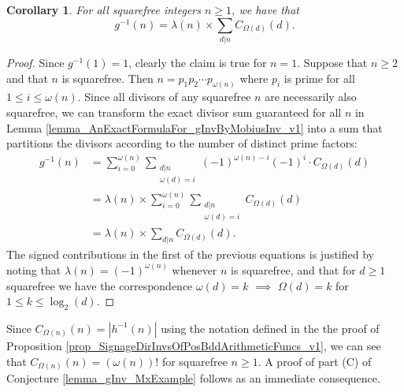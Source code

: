 \documentclass[11pt,reqno,a4letter]{article}
\numberwithin{figure}{section}
\numberwithin{table}{section}
\theoremstyle{plain}
\newtheorem{cor}[theorem]{Corollary}
\numberwithin{theorem}{section}
\theoremstyle{definition}
\begin{document}
\begin{cor} 
\label{cor_AnExactFormulaFor_gInvByMobiusInv_nSqFree_v2} 
For all squarefree integers $n \geq 1$, we have that 
\begin{equation} 
\label{eqn_gInvnSqFreeN_exactDivSum_Formula} 
g^{-1}(n) = \lambda(n) \times \sum_{d|n} C_{\Omega(d)}(d). 
\end{equation} 
\end{cor} 
\begin{proof} 
Since $g^{-1}(1) = 1$, clearly the claim is true for $n = 1$. Suppose that $n \geq 2$ and that 
$n$ is squarefree. Then $n = p_1p_2 \cdots p_{\omega(n)}$ where $p_i$ is prime for all 
$1 \leq i \leq \omega(n)$. Since all divisors of any squarefree $n$ are necessarily also squarefree, 
we can transform the exact divisor sum guaranteed for all $n$ in 
Lemma \ref{lemma_AnExactFormulaFor_gInvByMobiusInv_v1} into a sum that partitions the divisors 
according to the number of distinct prime factors: 
\begin{align*} 
g^{-1}(n) & = \sum_{i=0}^{\omega(n)} \sum_{\substack{d|n \\ \omega(d)=i}} (-1)^{\omega(n) - i} (-1)^{i} \cdot 
     C_{\Omega(d)}(d) \\ 
     & = \lambda(n) \times \sum_{i=0}^{\omega(n)} \sum_{\substack{d|n \\ \omega(d)=i}} C_{\Omega(d)}(d) \\ 
     & = \lambda(n) \times \sum_{d|n} C_{\Omega(d)}(d). 
\end{align*} 
The signed contributions in the first of the previous equations is 
justified by noting that $\lambda(n) = (-1)^{\omega(n)}$ 
whenever $n$ is squarefree, and that for $d \geq 1$
 squarefree we have the correspondence 
 $\omega(d) = k$ $\implies$ $\Omega(d) = k$ for $1 \leq k \leq \log_2(d)$. 
\end{proof} 

Since $C_{\Omega(n)}(n) = |h^{-1}(n)|$ using the notation defined in the the proof of 
Proposition \ref{prop_SignageDirInvsOfPosBddArithmeticFuncs_v1}, we can see that 
$C_{\Omega(n)}(n) = (\omega(n))!$ for squarefree $n \geq 1$. 
A proof of part (C) of Conjecture \ref{lemma_gInv_MxExample} 
follows as an immediate consequence. 
\end{document}
